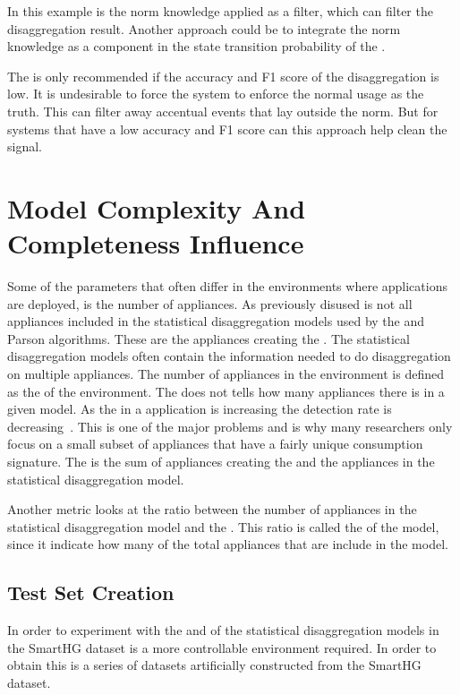 In this example is the norm knowledge applied as a filter, which can filter the disaggregation result. Another approach could be to integrate the norm knowledge as a component in the state transition probability of the .

The  is only recommended if the accuracy and F1 score of the disaggregation is low. It is undesirable to force the system to enforce the normal usage as the truth. This can filter away accentual events that lay outside the norm. But for systems that have a low accuracy and F1 score can this approach help clean the signal. 

\section{Model Complexity And Completeness Influence}
\label{sec:MCACI}
Some of the parameters that often differ in the environments where  applications are deployed, is the number of appliances. As previously disused is not all appliances included in the statistical disaggregation models used by the  and Parson algorithms. These are the appliances creating the . The statistical disaggregation models often contain the information needed to do disaggregation on multiple appliances. The number of appliances in the environment is defined as the  of the environment. The  does not tells how many appliances there is in a given model. As the  in a  application is increasing the detection rate is decreasing~\citep{RefWorks:34}. This is one of the major problems and is why many researchers only focus on a small subset of appliances that have a fairly unique consumption signature. The  is the sum of appliances creating the  and the appliances in the statistical disaggregation model. 

Another metric looks at the ratio between the number of appliances in the statistical disaggregation model and the . This ratio is called the  of the model, since it indicate how many of the total appliances that are include in the model.


\subsection{Test Set Creation}
\label{sec:datasetCreation}
In order to experiment with the  and  of the statistical disaggregation models in the SmartHG dataset is a more controllable environment required. In order to obtain this is a series of datasets artificially constructed from the SmartHG dataset. 

